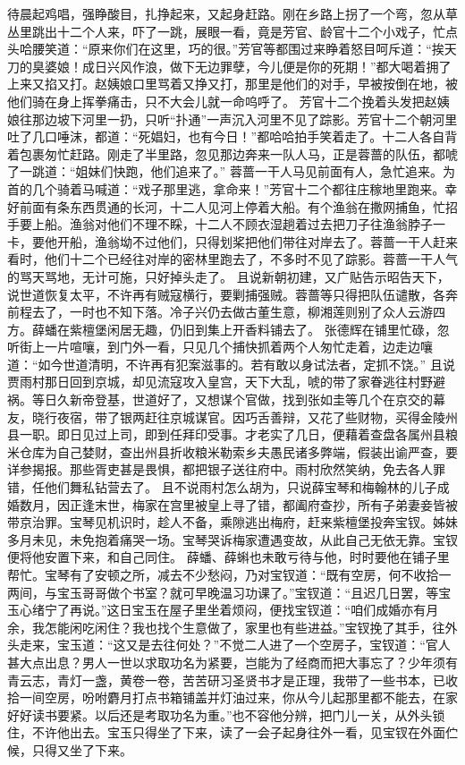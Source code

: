 \documentclass[12pt,oneside]{book}
\begin{document}
待晨起鸡唱，强睁酸目，扎挣起来，又起身赶路。刚在乡路上拐了一个弯，忽从草丛里跳出十二个人来，吓了一跳，展眼一看，竟是芳官、龄官十二个小戏子，忙点头哈腰笑道：“原来你们在这里，巧的很。”芳官等都围过来睁着怒目呵斥道：“挨天刀的臭婆娘！成日兴风作浪，做下无边罪孽，今儿便是你的死期！”都大喝着拥了上来又掐又打。赵姨娘口里骂着又挣又打，那里是他们的对手，早被按倒在地，被他们骑在身上挥拳痛击，只不大会儿就一命呜呼了。
芳官十二个挽着头发把赵姨娘往那边坡下河里一扔，只听“扑通”一声沉入河里不见了踪影。芳官十二个朝河里吐了几口唾沫，都道：“死娼妇，也有今日！”都哈哈拍手笑着走了。十二人各自背着包裹匆忙赶路。刚走了半里路，忽见那边奔来一队人马，正是蓉蔷的队伍，都唬了一跳道：“姐妹们快跑，他们追来了。”
蓉蔷一干人马见前面有人，急忙追来。为首的几个骑着马喊道：“戏子那里逃，拿命来！”芳官十二个都往庄稼地里跑来。幸好前面有条东西贯通的长河，十二人见河上停着大船。有个渔翁在撒网捕鱼，忙招手要上船。渔翁对他们不理不睬，十二人不顾衣湿趟着过去把刀子往渔翁脖子一卡，要他开船，渔翁坳不过他们，只得划桨把他们带往对岸去了。蓉蔷一干人赶来看时，他们十二个已经往对岸的密林里跑去了，不多时不见了踪影。蓉蔷一干人气的骂天骂地，无计可施，只好掉头走了。
且说新朝初建，又广贴告示昭告天下，说世道恢复太平，不许再有贼寇横行，要剿捕强贼。蓉蔷等只得把队伍谴散，各奔前程去了，一时也不知下落。冷子兴仍去做古董生意，柳湘莲则别了众人云游四方。薛蟠在紫檀堡闲居无趣，仍旧到集上开香料铺去了。
张德辉在铺里忙碌，忽听街上一片喧嚷，到门外一看，只见几个捕快抓着两个人匆忙走着，边走边嚷道：“如今世道清明，不许再有犯案滋事的。若有敢以身试法者，定抓不饶。”
且说贾雨村那日回到京城，却见流寇攻入皇宫，天下大乱，唬的带了家眷逃往村野避祸。等日久新帝登基，世道好了，又想谋个官做，找到张如圭等几个在京交的幕友，晓行夜宿，带了银两赶往京城谋官。因巧舌善辩，又花了些财物，买得金陵州县一职。即日见过上司，即到任拜印受事。才老实了几日，便藉着查盘各属州县粮米仓库为自己婪财，查出州县折收粮米勒索乡夫愚民诸多弊端，假装出谕严查，要详参揭报。那些胥吏甚是畏惧，都把银子送往府中。雨村欣然笑纳，免去各人罪错，任他们舞私钻营去了。
且不说雨村怎么胡为，只说薛宝琴和梅翰林的儿子成婚数月，因正逢末世，梅家在宫里被皇上寻了错，都阖府查抄，所有子弟妻妾皆被带京治罪。宝琴见机识时，趁人不备，乘隙逃出梅府，赶来紫檀堡投奔宝钗。姊妹多月未见，未免抱着痛哭一场。宝琴哭诉梅家遭遇变故，从此自己无依无靠。宝钗便将他安置下来，和自己同住。
薛蟠、薛蝌也未敢亏待与他，时时要他在铺子里帮忙。宝琴有了安顿之所，减去不少愁闷，乃对宝钗道：“既有空房，何不收拾一两间，与宝玉哥哥做个书室？就可早晚温习功课了。”宝钗道：“且迟几日罢，等宝玉心绪宁了再说。”这日宝玉在屋子里坐着烦闷，便找宝钗道：“咱们成婚亦有月余，我怎能闲吃闲住？我也找个生意做了，家里也有些进益。”宝钗挽了其手，往外头走来，宝玉道：“这又是去往何处？”不觉二人进了一个空房子，宝钗道：“官人甚大点出息？男人一世以求取功名为紧要，岂能为了经商而把大事忘了？少年须有青云志，青灯一盏，黄卷一卷，苦苦研习圣贤书才是正理，我带了一些书本，已收拾一间空房，吩咐麝月打点书箱铺盖并灯油过来，你从今儿起那里都不能去，在家好好读书要紧。以后还是考取功名为重。”也不容他分辨，把门儿一关，从外头锁住，不许他出去。宝玉只得坐了下来，读了一会子起身往外一看，见宝钗在外面伫候，只得又坐了下来。
\end{document}

